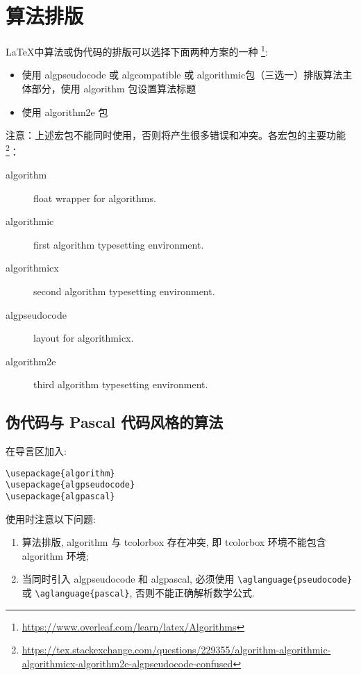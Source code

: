\chapter{算法排版}

{\LaTeX}中算法或伪代码的排版可以选择下面两种方案的一种
\footnote{\url{https://www.overleaf.com/learn/latex/Algorithms}}:

\begin{itemize}
  \item 使用 algpseudocode 或 algcompatible 或 algorithmic包（三选一）排版算法主体部分，使用 algorithm 包设置算法标题
  \item 使用 algorithm2e 包
\end{itemize}

注意：上述宏包不能同时使用，否则将产生很多错误和冲突。各宏包的主要功能
\footnote{\url{https://tex.stackexchange.com/questions/229355/algorithm-algorithmic-algorithmicx-algorithm2e-algpseudocode-confused}}：
\begin{description}
  \item [algorithm] float wrapper for algorithms.
  \item [algorithmic] first algorithm typesetting environment.
  \item [algorithmicx] second algorithm typesetting environment.
  \item [algpseudocode] layout for algorithmicx.
  \item [algorithm2e] third algorithm typesetting environment.
\end{description}

\section{伪代码与 Pascal 代码风格的算法}

在导言区加入:
\begin{verbatim}
\usepackage{algorithm}
\usepackage{algpseudocode}
\usepackage{algpascal}
\end{verbatim}



\begin{remark*}
使用时注意以下问题:
\begin{enumerate}
  \item 算法排版, algorithm 与 tcolorbox 存在冲突, 即 {\ttfamily tcolorbox} 环境不能包含 {\ttfamily algorithm} 环境;
  \item 当同时引入 algpseudocode 和 algpascal, 必须使用 \verb|\aglanguage{pseudocode}| 或 
  \verb|\aglanguage{pascal}|, 否则不能正确解析数学公式.
\end{enumerate}
\end{remark*}

